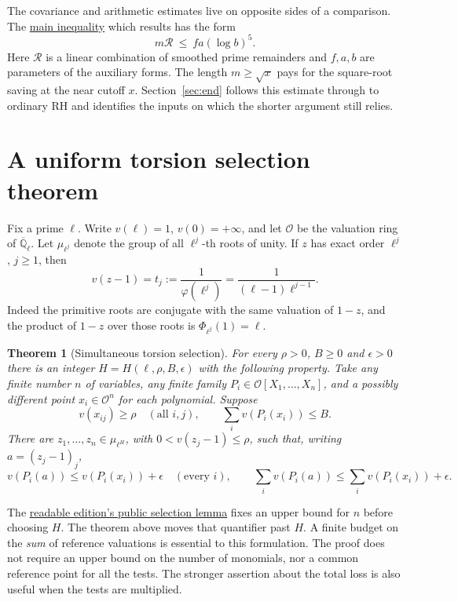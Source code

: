 \documentclass[11pt]{article}
\newtheorem{theorem}{Theorem}[section]\newtheorem{lemma}[theorem]{Lemma}\newtheorem{corollary}[theorem]{Corollary}
\newcommand{\cO}{\mathcal O}\newcommand{\Tr}{\operatorname{tr}}
\newcommand{\src}[3]{\href{https://github.com/lsernau/grh-lean/blob/72fead102f663d5c7a407964a13dc0cf9d977207/grh/src/#1.lean\#L#2}{#3}}
\newcommand{\rootsrc}[2]{\src{New/Congruences/Selmer/RootsOfUnity}{#1}{#2}}
\begin{document}
The covariance and arithmetic estimates live on opposite sides of a comparison. The \src{New/Reduction/MainInequality}{87}{main inequality} which results has the form
\[
                   m\mathcal R\ \leq\ f a(\log b)^5 .
\]
Here $\mathcal R$ is a linear combination of smoothed prime remainders and $f,a,b$ are parameters of the auxiliary forms. The length $m\ge\sqrt{x}$ pays for the square-root saving at the near cutoff $x$. Section~\ref{sec:end} follows this estimate through to ordinary RH and identifies the inputs on which the shorter argument still relies.
\newpage
\section{A uniform torsion selection theorem}\label{sec:statement}
Fix a prime $\ell$. Write $v(\ell)=1$, $v(0)=+\infty$, and let $\cO$ be the valuation ring of $\overline{\mathbb Q}_\ell$. Let $\mu_{\ell^j}$ denote the group of all $\ell^j$-th roots of unity. If $z$ has exact order $\ell^j$, $j\ge1$, then
\begin{equation}
                  v(z-1)=t_j:=\frac{1}{\varphi(\ell^j)}
                  =\frac{1}{(\ell-1)\ell^{j-1}}.\label{eq:radius}
\end{equation}
Indeed the primitive roots are conjugate with the same valuation of $1-z$, and the product of $1-z$ over those roots is $\Phi_{\ell^j}(1)=\ell$.
\begin{theorem}[Simultaneous torsion selection]\label{th:main}
For every $\rho>0$, $B\ge0$ and $\epsilon>0$ there is an integer $H=H(\ell,\rho,B,\epsilon)$ with the following property. Take any finite number $n$ of variables, any finite family $P_i\in\cO[X_1,\ldots,X_n]$, and a possibly different point $x_i\in\cO^n$ for each polynomial. Suppose
\[
     v(x_{ij})\ge\rho\quad(\text{all }i,j),\qquad
     \sum_i v(P_i(x_i))\le B .
\]
There are $z_1,\ldots,z_n\in\mu_{\ell^H}$, with $0<v(z_j-1)\le\rho$, such that, writing $a=(z_j-1)_j$,
\[
  v(P_i(a))\le v(P_i(x_i))+\epsilon\quad(\text{every }i),\qquad
  \sum_i v(P_i(a))\le \sum_i v(P_i(x_i))+\epsilon .
\]
\end{theorem}
The \rootsrc{474}{readable edition's public selection lemma} fixes an upper bound for $n$ before choosing $H$. The theorem above moves that quantifier past $H$. A finite budget on the \emph{sum} of reference valuations is essential to this formulation. The proof does not require an upper bound on the number of monomials, nor a common reference point for all the tests. The stronger assertion about the total loss is also useful when the tests are multiplied.
\end{document}
